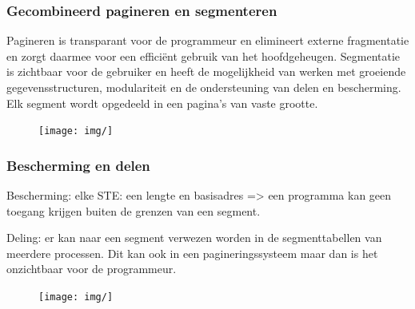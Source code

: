 \subsubsection{Gecombineerd pagineren en segmenteren}

Pagineren is transparant voor de programmeur en elimineert externe fragmentatie en zorgt daarmee voor een efficiënt gebruik van het hoofdgeheugen. Segmentatie is zichtbaar voor de gebruiker en heeft de mogelijkheid van werken met groeiende gegevensstructuren, modulariteit en de ondersteuning van delen en bescherming. Elk segment wordt opgedeeld in een pagina’s van vaste grootte.

\begin{figure}[htp]
    \centering
            \texttt{[image: img/]}
        \caption{}
    \label{fig:}
\end{figure}


\subsubsection{Bescherming en delen}

Bescherming: elke STE: een lengte en basisadres => een programma kan geen toegang krijgen buiten de grenzen van een segment.

Deling: er kan naar een segment verwezen worden in de segmenttabellen van meerdere 
processen. Dit kan ook in een pagineringssysteem maar dan is het onzichtbaar voor de programmeur.


\begin{figure}[htp]
    \centering
            \texttt{[image: img/]}
        \caption{}
    \label{fig:}
\end{figure}
